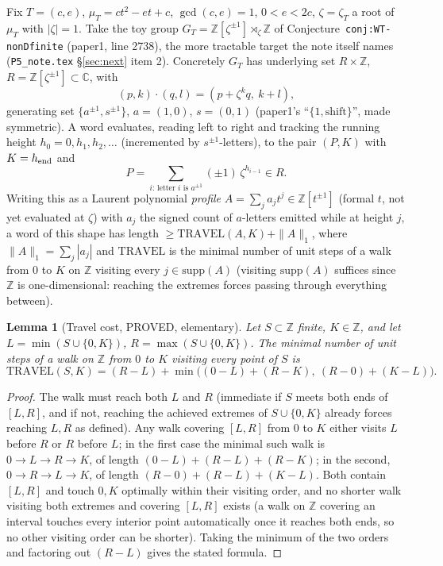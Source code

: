 \documentclass[11pt]{article}
\newtheorem{lemma}[theorem]{Lemma}
\theoremstyle{remark}
\newcommand{\Z}{\mathbb Z}
\newcommand{\C}{\mathbb C}
\begin{document}
Fix $T=(c,e)$, $\mu_T=ct^2-et+c$, $\gcd(c,e)=1$, $0<e<2c$, $\zeta=\zeta_T$ a root of $\mu_T$ with
$|\zeta|=1$. Take the toy group $G_T=\Z[\zeta^{\pm1}]\rtimes_\zeta\Z$ of
Conjecture~\texttt{conj:WT-nonDfinite} (paper1, line 2738), the more tractable target the note itself
names (\texttt{P5\_note.tex} \S\ref{sec:next} item 2). Concretely $G_T$ has underlying set
$R\times\Z$, $R=\Z[\zeta^{\pm1}]\subset\C$, with
\[
(p,k)\cdot(q,l) = (p+\zeta^k q,\ k+l),
\]
generating set $\{a^{\pm1},s^{\pm1}\}$, $a=(1,0)$, $s=(0,1)$ (paper1's ``$\{1,\text{shift}\}$'', made
symmetric). A word evaluates, reading left to right and tracking the running height
$h_0=0,h_1,h_2,\dots$ (incremented by $s^{\pm1}$-letters), to the pair $(P,K)$ with $K=h_{\rm end}$ and
\[
P=\sum_{i:\,\text{letter }i\text{ is }a^{\pm1}} (\pm1)\,\zeta^{h_{i-1}} \in R.
\]
Writing this as a Laurent polynomial \emph{profile} $A=\sum_j a_j t^j\in\Z[t^{\pm1}]$ (formal $t$, not
yet evaluated at $\zeta$) with $a_j$ the signed count of $a$-letters emitted while at height $j$, a word
of this shape has length $\ge \mathrm{TRAVEL}(A,K)+\|A\|_1$, where $\|A\|_1=\sum_j|a_j|$ and
$\mathrm{TRAVEL}$ is the minimal number of unit steps of a walk from $0$ to $K$ on $\Z$ visiting every
$j\in\mathrm{supp}(A)$ (visiting $\mathrm{supp}(A)$ suffices since $\Z$ is one-dimensional: reaching the
extremes forces passing through everything between).

\begin{lemma}[Travel cost, PROVED, elementary]\label{lem:travel}
Let $S\subset\Z$ finite, $K\in\Z$, and let $L=\min(S\cup\{0,K\})$, $R=\max(S\cup\{0,K\})$. The minimal
number of unit steps of a walk on $\Z$ from $0$ to $K$ visiting every point of $S$ is
\[
\mathrm{TRAVEL}(S,K) = (R-L) + \min\bigl((0-L)+(R-K),\ (R-0)+(K-L)\bigr).
\]
\end{lemma}
\begin{proof}
The walk must reach both $L$ and $R$ (immediate if $S$ meets both ends of $[L,R]$, and if not, reaching
the achieved extremes of $S\cup\{0,K\}$ already forces reaching $L,R$ as defined). Any walk covering
$[L,R]$ from $0$ to $K$ either visits $L$ before $R$ or $R$ before $L$; in the first case the minimal
such walk is $0\to L\to R\to K$, of length $(0-L)+(R-L)+(R-K)$; in the second, $0\to R\to L\to K$, of
length $(R-0)+(R-L)+(K-L)$. Both contain $[L,R]$ and touch $0,K$ optimally within their visiting order,
and no shorter walk visiting both extremes and covering $[L,R]$ exists (a walk on $\Z$ covering an
interval touches every interior point automatically once it reaches both ends, so no other visiting
order can be shorter). Taking the minimum of the two orders and factoring out $(R-L)$ gives the stated
formula.
\end{proof}
\end{document}
